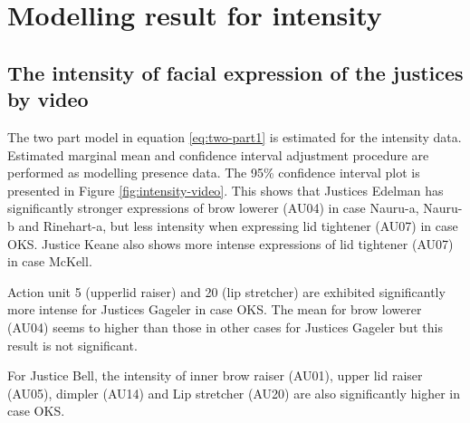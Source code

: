 \documentclass{monashthesis}
\begin{document}
\hypertarget{modelling-result-for-intensity}{%
\section{Modelling result for intensity}\label{modelling-result-for-intensity}}

\hypertarget{the-intensity-of-facial-expression-of-the-justices-by-video}{%
\subsection{The intensity of facial expression of the justices by video}\label{the-intensity-of-facial-expression-of-the-justices-by-video}}

The two part model in equation \ref{eq:two-part1} is estimated for the intensity data. Estimated marginal mean and confidence interval adjustment procedure are performed as modelling presence data. The 95\% confidence interval plot is presented in Figure \ref{fig:intensity-video}. This shows that Justices Edelman has significantly stronger expressions of brow lowerer (AU04) in case Nauru-a, Nauru-b and Rinehart-a, but less intensity when expressing lid tightener (AU07) in case OKS. Justice Keane also shows more intense expressions of lid tightener (AU07) in case McKell.

Action unit 5 (upperlid raiser) and 20 (lip stretcher) are exhibited significantly more intense for Justices Gageler in case OKS. The mean for brow lowerer (AU04) seems to higher than those in other cases for Justices Gageler but this result is not significant.

For Justice Bell, the intensity of inner brow raiser (AU01), upper lid raiser (AU05), dimpler (AU14) and Lip stretcher (AU20) are also significantly higher in case OKS.
\end{document}

